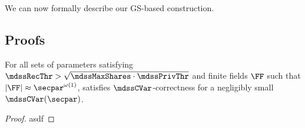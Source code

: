 We can now formally describe our GS-based construction.
\begin{pcvstack}[boxed, center, space=1em]

\end{pcvstack}

\subsection{Proofs}

\begin{theorem}
	For all sets of parameters satisfying $\mdssRecThr > \sqrt{\mdssMaxShares \cdot \mdssPrivThr}$ and finite fields $\FF$ such that $|\FF| \approx \secpar^{\omega(1)}$,  satisfies $\mdssCVar$-correctness for a negligibly small $\mdssCVar(\secpar)$.
\end{theorem}

\begin{proof}
	asdf
\end{proof}
